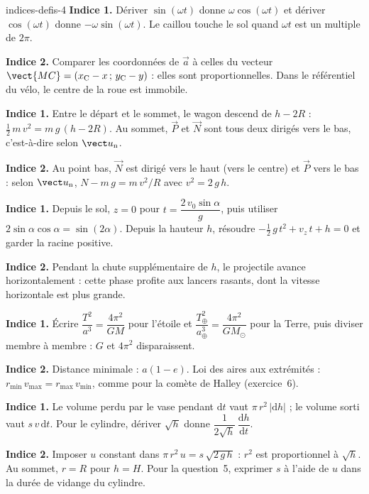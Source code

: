 \begin{blocEdition}{indices-defis-4}
\textbf{Indice 1.} Dériver $\sin(\omega t)$ donne $\omega\cos(\omega t)$ et dériver $\cos(\omega t)$ donne
$-\omega\sin(\omega t)$. Le caillou touche le sol quand $\omega t$ est un multiple de $2\pi$.\par\smallskip
\textbf{Indice 2.} Comparer les coordonnées de $\vec{a}$ à celles du vecteur $\vect{MC}=(x_\mathrm{C}-x\,;\,y_\mathrm{C}-y)$ :
elles sont proportionnelles. Dans le référentiel du vélo, le centre de la roue est immobile.\par\smallskip
{}
\textbf{Indice 1.} Entre le départ et le sommet, le wagon descend de $h-2R$ : $\frac12\,m\,v^2=m\,g\,(h-2R)$. Au sommet,
$\vec{P}$ et $\vec{N}$ sont tous deux dirigés vers le bas, c'est-à-dire selon $\un$.\par\smallskip
\textbf{Indice 2.} Au point bas, $\vec{N}$ est dirigé vers le haut (vers le centre) et $\vec{P}$ vers le bas : selon
$\un$, $N-m\,g=m\,v^2/R$ avec $v^2=2\,g\,h$.\par\smallskip
{}
\textbf{Indice 1.} Depuis le sol, $z=0$ pour $t=\dfrac{2\,v_0\sin\alpha}{g}$, puis utiliser $2\sin\alpha\cos\alpha=\sin(2\alpha)$.
Depuis la hauteur $h$, résoudre $-\frac12\,g\,t^2+v_z\,t+h=0$ et garder la racine positive.\par\smallskip
\textbf{Indice 2.} Pendant la chute supplémentaire de $h$, le projectile avance horizontalement : cette phase profite aux
lancers rasants, dont la vitesse horizontale est plus grande.\par\smallskip
{}
\textbf{Indice 1.} Écrire $\dfrac{T^2}{a^3}=\dfrac{4\pi^2}{GM}$ pour l'étoile et $\dfrac{T_\oplus^2}{a_\oplus^3}=\dfrac{4\pi^2}{GM_\odot}$ pour la Terre,
puis diviser membre à membre : $G$ et $4\pi^2$ disparaissent.\par\smallskip
\textbf{Indice 2.} Distance minimale : $a(1-e)$. Loi des aires aux extrémités : $r_\text{min}\,v_\text{max}=r_\text{max}\,v_\text{min}$,
comme pour la comète de Halley (exercice~6).\par\smallskip
{}
\textbf{Indice 1.} Le volume perdu par le vase pendant $\mathrm{d}t$ vaut $\pi\,r^2\,|\mathrm{d}h|$ ; le volume sorti vaut
$s\,v\,\mathrm{d}t$. Pour le cylindre, dériver $\sqrt{h}$ donne $\dfrac{1}{2\sqrt{h}}\,\dfrac{\mathrm{d}h}{\mathrm{d}t}$.\par\smallskip
\textbf{Indice 2.} Imposer $u$ constant dans $\pi\,r^2\,u=s\,\sqrt{2\,g\,h}$ : $r^2$ est proportionnel à $\sqrt{h}$. Au sommet,
$r=R$ pour $h=H$. Pour la question~5, exprimer $s$ à l'aide de $u$ dans la durée de vidange du cylindre.\par\smallskip
\end{blocEdition}

